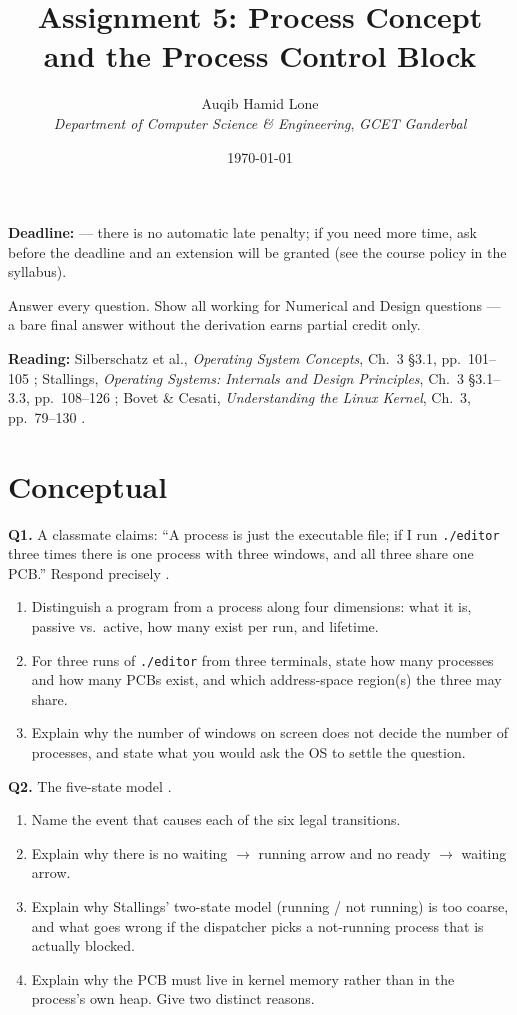 \documentclass[11pt]{article}
\title{Assignment 5: Process Concept and the Process Control Block}
\author{Auqib Hamid Lone\\[0.3em]
  \emph{Department of Computer Science \& Engineering}, \emph{GCET Ganderbal}}
\date{\today}
\begin{document}
\maketitle

\noindent\textbf{Deadline:}  --- there is no automatic late penalty; if you need more time, ask before the deadline and an extension will be granted (see the course policy in the syllabus).

\noindent Answer every question. Show all working for Numerical and Design questions --- a bare final answer without the derivation earns partial credit only.

\noindent\textbf{Reading:} Silberschatz et al., \emph{Operating System Concepts}, Ch.~3 \S3.1, pp.~101--105 \cite{SilberschatzOSC_operating_system_concepts}; Stallings, \emph{Operating Systems: Internals and Design Principles}, Ch.~3 \S3.1--3.3, pp.~108--126 \cite{StallingsOS_internals_design_principles}; Bovet \& Cesati, \emph{Understanding the Linux Kernel}, Ch.~3, pp.~79--130 \cite{BovetCesati_understanding_linux_kernel}.

\section{Conceptual}

\textbf{Q1.} A classmate claims: ``A process is just the executable file; if I run \texttt{./editor} three times there is one process with three windows, and all three share one PCB.'' Respond precisely \cite{SilberschatzOSC_operating_system_concepts}.
\begin{enumerate}
  \item[(a)] Distinguish a program from a process along four dimensions: what it is, passive vs.\ active, how many exist per run, and lifetime.
  \item[(b)] For three runs of \texttt{./editor} from three terminals, state how many processes and how many PCBs exist, and which address-space region(s) the three may share.
  \item[(c)] Explain why the number of windows on screen does not decide the number of processes, and state what you would ask the OS to settle the question.
\end{enumerate}

\textbf{Q2.} The five-state model \cite{StallingsOS_internals_design_principles}.
\begin{enumerate}
  \item[(a)] Name the event that causes each of the six legal transitions.
  \item[(b)] Explain why there is no waiting $\to$ running arrow and no ready $\to$ waiting arrow.
  \item[(c)] Explain why Stallings' two-state model (running / not running) is too coarse, and what goes wrong if the dispatcher picks a not-running process that is actually blocked.
  \item[(d)] Explain why the PCB must live in kernel memory rather than in the process's own heap. Give two distinct reasons.
\end{enumerate}
\end{document}
